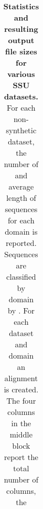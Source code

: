 \begin{table}[hb]
\begin{center}
\begin{tabular}{lllrr|rrrr|rr}
\end{tabular}
\end{center}
\caption{\textbf{Statistics and resulting output file sizes for
    various SSU datasets.} For each non-synthetic dataset, the number
  of and average length of sequences for each domain is
  reported. Sequences are classified by domain by .
  For each dataset and domain an alignment is created. The four
  columns in the middle block report the total number of columns, the
}
\end{table}
